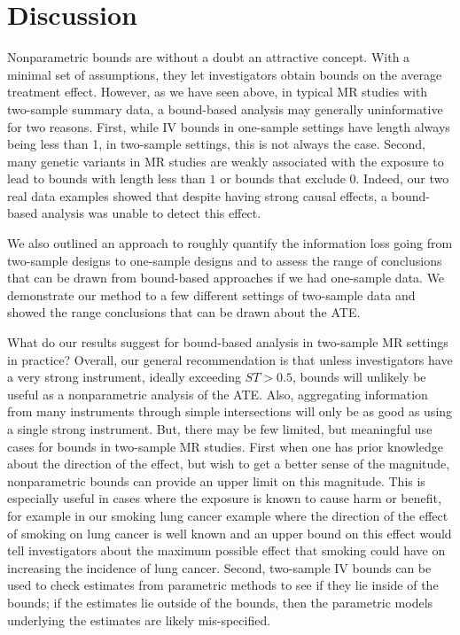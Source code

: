 \documentclass[
]{article}
\theoremstyle{plain}
\begin{document}
\hypertarget{discussion}{%
\section{\texorpdfstring{Discussion \label{conclusion-and-practical-considerations}}{Discussion }}\label{discussion}}

Nonparametric bounds are without a doubt an attractive concept. With a minimal set of assumptions, they let investigators obtain bounds on the average treatment effect. However, as we have seen above, in typical MR studies with two-sample summary data, a bound-based analysis may generally uninformative for two reasons. First, while IV bounds in one-sample settings have length always being less than 1, in two-sample settings, this is not always the case. Second, many genetic variants in MR studies are weakly associated with the exposure to lead to bounds with length less than \(1\) or bounds that exclude \(0\). Indeed, our two real data examples showed that despite having strong causal effects, a bound-based analysis was unable to detect this effect.

We also outlined an approach to roughly quantify the information loss going from two-sample designs to one-sample designs and to assess the range of conclusions that can be drawn from bound-based approaches if we had one-sample data. We demonstrate our method to a few different settings of two-sample data and showed the range conclusions that can be drawn about the ATE.

What do our results suggest for bound-based analysis in two-sample MR settings in practice? Overall, our general recommendation is that unless investigators have a very strong instrument, ideally exceeding \(ST > 0.5\), bounds will unlikely be useful as a nonparametric analysis of the ATE. Also, aggregating information from many instruments through simple intersections will only be as good as using a single strong instrument. But, there may be few limited, but meaningful use cases for bounds in two-sample MR studies. First when one has prior knowledge about the direction of the effect, but wish to get a better sense of the magnitude, nonparametric bounds can provide an upper limit on this magnitude. This is especially useful in cases where the exposure is known to cause harm or benefit, for example in our smoking lung cancer example where the direction of the effect of smoking on lung cancer is well known and an upper bound on this effect would tell investigators about the maximum possible effect that smoking could have on increasing the incidence of lung cancer. Second, two-sample IV bounds can be used to check estimates from parametric methods to see if they lie inside of the bounds; if the estimates lie outside of the bounds, then the parametric models underlying the estimates are likely mis-specified.
\end{document}
